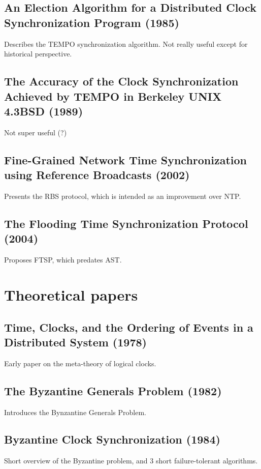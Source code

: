 \documentclass{article}
\begin{document}
\subsection*{An Election Algorithm for a Distributed Clock Synchronization Program (1985)}
Describes the TEMPO synchronization algorithm. Not really useful except for historical perspective.

\subsection*{The Accuracy of the Clock Synchronization Achieved by TEMPO in Berkeley UNIX 4.3BSD (1989)}
Not super useful (?)

\subsection*{Fine-Grained Network Time Synchronization using Reference Broadcasts (2002)}
Presents the RBS protocol, which is intended as an improvement over NTP.

\subsection*{The Flooding Time Synchronization Protocol (2004)}
Proposes FTSP, which predates AST.

\vspace{4em}
\section{Theoretical papers}

\subsection*{Time, Clocks, and the Ordering of Events in a Distributed System (1978)}
Early paper on the meta-theory of logical clocks.

\subsection*{The Byzantine Generals Problem (1982)}
Introduces the Bynzantine Generals Problem.

\subsection*{Byzantine Clock Synchronization (1984)}
Short overview of the Byzantine problem, and 3 short failure-tolerant algorithms.
\end{document}
